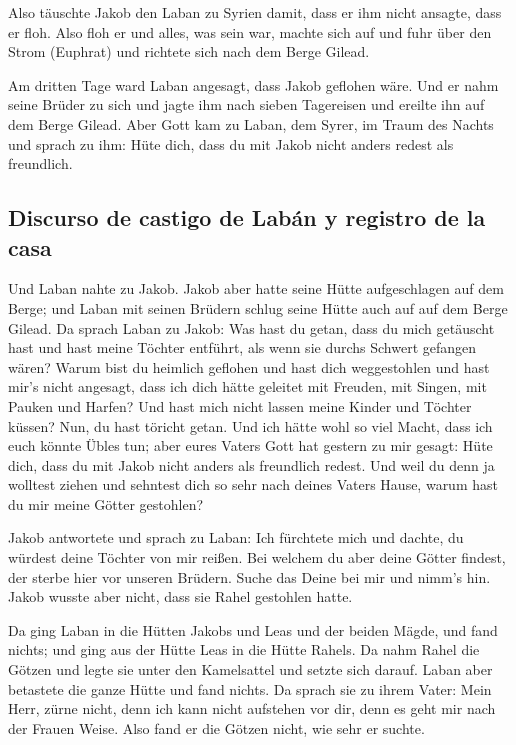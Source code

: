  Also täuschte Jakob den Laban zu Syrien damit, dass er
ihm nicht ansagte, dass er floh.  Also floh er und alles,
was sein war, machte sich auf und fuhr über den Strom (Euphrat) und
richtete sich nach dem Berge Gilead.

 Am dritten Tage ward Laban angesagt, dass Jakob geflohen
wäre.  Und er nahm seine Brüder zu sich und jagte ihm
nach sieben Tagereisen und ereilte ihn auf dem Berge Gilead.
 Aber Gott kam zu Laban, dem Syrer, im Traum des Nachts
und sprach zu ihm: Hüte dich, dass du mit Jakob nicht anders redest als
freundlich.

\hypertarget{discurso-de-castigo-de-labuxe1n-y-registro-de-la-casa}{%
\subsection{Discurso de castigo de Labán y registro de la
casa}\label{discurso-de-castigo-de-labuxe1n-y-registro-de-la-casa}}

 Und Laban nahte zu Jakob. Jakob aber hatte seine Hütte
aufgeschlagen auf dem Berge; und Laban mit seinen Brüdern schlug seine
Hütte auch auf auf dem Berge Gilead.  Da sprach Laban zu
Jakob: Was hast du getan, dass du mich getäuscht hast und hast meine
Töchter entführt, als wenn sie durchs Schwert gefangen wären?
 Warum bist du heimlich geflohen und hast dich
weggestohlen und hast mir's nicht angesagt, dass ich dich hätte geleitet
mit Freuden, mit Singen, mit Pauken und Harfen?  Und hast
mich nicht lassen meine Kinder und Töchter küssen? Nun, du hast töricht
getan.  Und ich hätte wohl so viel Macht, dass ich euch
könnte Übles tun; aber eures Vaters Gott hat gestern zu mir gesagt: Hüte
dich, dass du mit Jakob nicht anders als freundlich redest.
 Und weil du denn ja wolltest ziehen und sehntest dich so
sehr nach deines Vaters Hause, warum hast du mir meine Götter gestohlen?

 Jakob antwortete und sprach zu Laban: Ich fürchtete mich
und dachte, du würdest deine Töchter von mir reißen.  Bei
welchem du aber deine Götter findest, der sterbe hier vor unseren
Brüdern. Suche das Deine bei mir und nimm's hin. Jakob wusste aber
nicht, dass sie Rahel gestohlen hatte.

 Da ging Laban in die Hütten Jakobs und Leas und der
beiden Mägde, und fand nichts; und ging aus der Hütte Leas in die Hütte
Rahels.  Da nahm Rahel die Götzen und legte sie unter den
Kamelsattel und setzte sich darauf. Laban aber betastete die ganze Hütte
und fand nichts.  Da sprach sie zu ihrem Vater: Mein
Herr, zürne nicht, denn ich kann nicht aufstehen vor dir, denn es geht
mir nach der Frauen Weise. Also fand er die Götzen nicht, wie sehr er
suchte.

